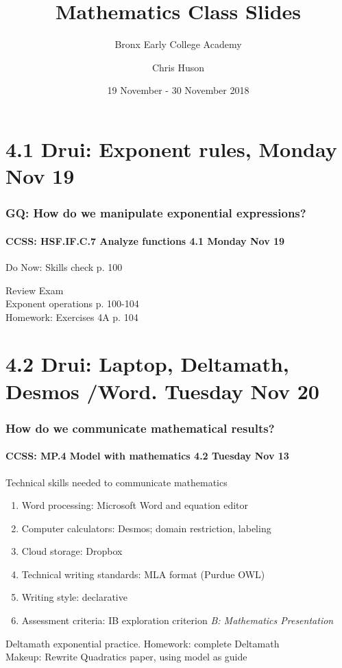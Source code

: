 \documentclass{beamer}
\title{Mathematics Class Slides}
\subtitle{Bronx Early College Academy}
\author{Chris Huson}
\date{19 November - 30 November 2018}
\begin{document}
\frame{\titlepage}

\section[Outline]{}
\frame{\tableofcontents}

  \section{4.1 Drui: Exponent rules, Monday Nov 19}
    \frame
    {
      \frametitle{GQ: How do we manipulate exponential expressions?}
      \framesubtitle{CCSS: HSF.IF.C.7 Analyze functions    \alert{4.1  Monday Nov 19}}

      \begin{block}{Do Now: Skills check p. 100}
      \end{block}
      Review Exam\\
      Exponent operations p. 100-104 \\ \bigskip
      Homework: Exercises 4A p. 104
    }

  \section{4.2 Drui: Laptop, Deltamath, Desmos /Word. Tuesday Nov 20}
    \frame
    {
      \frametitle{How do we communicate mathematical results?}
      \framesubtitle{CCSS: MP.4 Model with mathematics  \alert{4.2 Tuesday Nov 13}}

      \begin{block}{Technical skills needed to communicate mathematics}
      \begin{enumerate}
          \item Word processing: Microsoft Word and equation editor
          \item Computer calculators: Desmos; domain restriction, labeling
          \item Cloud storage: Dropbox
          \item Technical writing standards: MLA format (Purdue OWL)
          \item Writing style: declarative
          \item Assessment criteria: IB exploration criterion \emph{B: Mathematics Presentation}
      \end{enumerate}
      \end{block}
      Deltamath exponential practice. Homework: complete Deltamath \\
      Makeup: Rewrite Quadratics paper, using model as guide}
\end{document}
